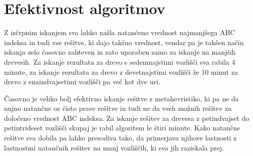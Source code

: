 \documentclass[a4paper,12 pt]{article}
\begin{document}
\section[Efektivnost algoritmov]{Efektivnost algoritmov}

Z izčrpnim iskanjem sva lahko našla natančeno vrednost najmanjšega ABC indeksa in tudi vse rešitve, ki dajo takšno vrednost, vendar pa je takšen način iskanja zelo časovno zahteven in zato uporaben samo za iskanje na manjših drevesih. Za iskanje rezultata za drevo s sedemnajstimi vozlišči sva rabila 4 minute, za iskanje rezultata za drevo z devetnajstimi vozlišči že 10 minut za drevo z enaindvajsetimi vozlišči pa več kot dve uri.

Časovno je veliko bolj efektivno iskanje rešitve z metahevristiko, ki pa ne da nujno natančne oz čisto prave rešitve in tudi ne da vseh možnih rešitev za določeno vrednost ABC indeksa. Za iskanje rešitev za drevesa z petindvajset do petintrideset vozlišči skupaj je rabil algoritem le štiri minute. Kako natančne rešitve sva dobila pa lahko presodiva tako, da primerjava njihove lastnosti z lastnostmi natančnih rešitev na manj vozliščih, ki sva jih raziskala prej.
\end{document}
